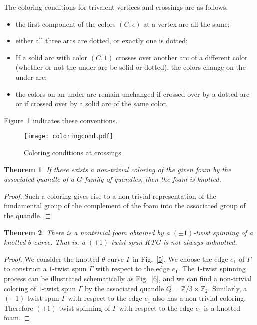 \documentclass{amsart}
\newcommand{\Z}{\mathbb{Z}}
\newtheorem{theorem}{Theorem}[section]
\theoremstyle{definition}
\theoremstyle{remark}
\numberwithin{equation}{section}
\begin{document}
The coloring conditions for trivalent vertices and crossings are as follows:
\begin{itemize}
\item the first component of the colors $(C,\epsilon)$  at a vertex are all the same;
\item either all three arcs are dotted, or exactly one is dotted;
\item If a solid arc with color $(C,1)$ crosses over another arc of a different color (whether or not the under arc be solid or dotted), the colors change on the under-arc;
\item the colors on an under-arc remain unchanged if crossed over by a dotted arc or if crossed over by a solid arc of the same color. \end{itemize}
Figure~\ref{coloringcond} indicates these conventions.  

\begin{figure}[h]
\texttt{[image: coloringcond.pdf]}
\caption{Coloring conditions at crossings}
\label{coloringcond}
\end{figure}


\begin{theorem}
If there exists a non-trivial coloring of the given foam by the associated quandle of a $G$-family of quandles, then the foam is knotted.
\end{theorem}

\begin{proof} Such a coloring gives rise to a non-trivial representation of the fundamental group of the complement of the foam into the associated group of the quandle.  
\end{proof}

\begin{theorem}
There is a nontrivial foam obtained by a $(\pm1)$-twist spinning of a knotted $\theta$-curve. That is, a $(\pm1)$-twist spun KTG is not always unknotted.
\end{theorem}

\begin{proof}
We consider the knotted $\theta$-curve $\Gamma$ in Fig.~\ref{5}. We choose the edge $e_{1}$ of $\Gamma$ to construct a $1$-twist spun $\Gamma$ with respect to the edge $e_{1}$. The $1$-twist spinning process can be illustrated schematically as Fig.~\ref{6}, and we can find a non-trivial coloring of $1$-twist spun $\Gamma$ by the associated quandle $Q=\Z/3\times \mathbb{Z}_{2}$. Similarly, a $(-1)$-twist spun $\Gamma$ with respect to the edge $e_{1}$ also has a non-trivial coloring. Therefore $(\pm1)$-twist spinning of $\Gamma$ with respect to the edge $e_{1}$ is a knotted foam.
\end{proof}
\end{document}
